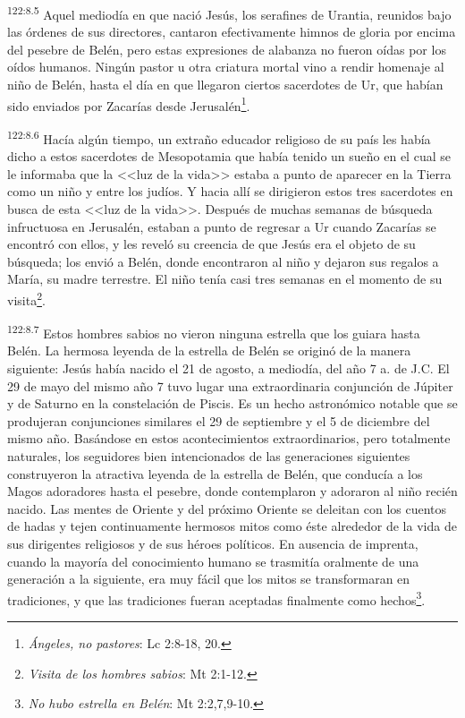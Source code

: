 \par 
\textsuperscript{122:8.5} Aquel mediodía en que nació Jesús, los serafines de Urantia, reunidos bajo las órdenes de sus directores, cantaron efectivamente himnos de gloria por encima del pesebre de Belén, pero estas expresiones de alabanza no fueron oídas por los oídos humanos. Ningún pastor u otra criatura mortal vino a rendir homenaje al niño de Belén, hasta el día en que llegaron ciertos sacerdotes de Ur, que habían sido enviados por Zacarías desde Jerusalén\footnote{\textit{Ángeles, no pastores}: Lc 2:8-18, 20.}.

\par 
\textsuperscript{122:8.6} Hacía algún tiempo, un extraño educador religioso de su país les había dicho a estos sacerdotes de Mesopotamia que había tenido un sueño en el cual se le informaba que la <<luz de la vida>> estaba a punto de aparecer en la Tierra como un niño y entre los judíos. Y hacia allí se dirigieron estos tres sacerdotes en busca de esta <<luz de la vida>>. Después de muchas semanas de búsqueda infructuosa en Jerusalén, estaban a punto de regresar a Ur cuando Zacarías se encontró con ellos, y les reveló su creencia de que Jesús era el objeto de su búsqueda; los envió a Belén, donde encontraron al niño y dejaron sus regalos a María, su madre terrestre. El niño tenía casi tres semanas en el momento de su visita\footnote{\textit{Visita de los hombres sabios}: Mt 2:1-12.}.

\par 
\textsuperscript{122:8.7} Estos hombres sabios no vieron ninguna estrella que los guiara hasta Belén. La hermosa leyenda de la estrella de Belén se originó de la manera siguiente: Jesús había nacido el 21 de agosto, a mediodía, del año 7 a. de J.C. El 29 de mayo del mismo año 7 tuvo lugar una extraordinaria conjunción de Júpiter y de Saturno en la constelación de Piscis. Es un hecho astronómico notable que se produjeran conjunciones similares el 29 de septiembre y el 5 de diciembre del mismo año. Basándose en estos acontecimientos extraordinarios, pero totalmente naturales, los seguidores bien intencionados de las generaciones siguientes construyeron la atractiva leyenda de la estrella de Belén, que conducía a los Magos adoradores hasta el pesebre, donde contemplaron y adoraron al niño recién nacido. Las mentes de Oriente y del próximo Oriente se deleitan con los cuentos de hadas y tejen continuamente hermosos mitos como éste alrededor de la vida de sus dirigentes religiosos y de sus héroes políticos. En ausencia de imprenta, cuando la mayoría del conocimiento humano se trasmitía oralmente de una generación a la siguiente, era muy fácil que los mitos se transformaran en tradiciones, y que las tradiciones fueran aceptadas finalmente como hechos\footnote{\textit{No hubo estrella en Belén}: Mt 2:2,7,9-10.}.

